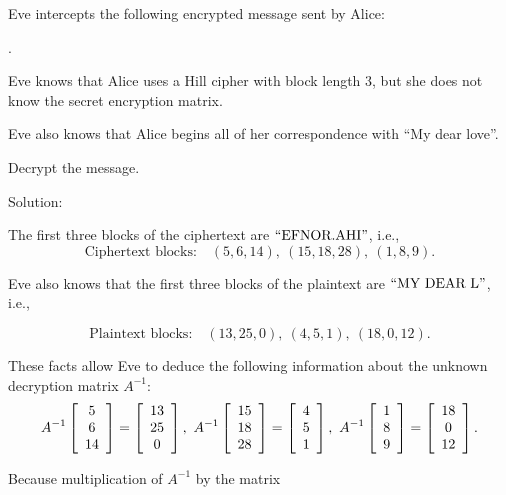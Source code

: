 \documentclass{ximera}
\begin{document}
\begin{example}\label{ex:hill-cipher-cryptanalysis}
  Eve intercepts the following encrypted message sent by Alice:%
  \begin{center}
    .
  \end{center}
  Eve knows that Alice uses a Hill cipher with block length 3, but she
  does not know the secret encryption matrix. 
  
  Eve also knows that
  Alice begins all of her correspondence with ``My dear
  love''. 
  
  Decrypt the message.

  Solution:

  The first three blocks of the ciphertext are $\q{EFNOR.AHI}$, i.e.,
  \begin{equation*}
    \mbox{Ciphertext blocks:}\quad
    (5,6,14),\
    (15,18,28),\
    (1,8,9).
  \end{equation*}

  Eve also knows that the first three blocks of the plaintext are
  $\q{MY DEAR L}$, i.e.,

  \begin{equation*}
    \mbox{Plaintext blocks:}\quad
    (13,25,0),\
    (4,5,1),\
    (18,0,12).
  \end{equation*}

  These facts allow Eve to deduce the following information about the
  unknown decryption matrix $A^{-1}$:
  \begin{equation*}
    A^{-1} \startmat{c} 5 \\ 6 \\ 14 \stopmat
    = \startmat{c} 13 \\ 25 \\ 0 \stopmat,\quad
    A^{-1} \startmat{c} 15 \\ 18 \\ 28 \stopmat
    = \startmat{c} 4 \\ 5 \\ 1 \stopmat,\quad
    A^{-1} \startmat{c} 1 \\ 8 \\ 9 \stopmat
    = \startmat{c} 18 \\ 0 \\ 12 \stopmat.
  \end{equation*}

  Because multiplication of $A^{-1}$ by the matrix 
  

\end{example}
\end{document}
